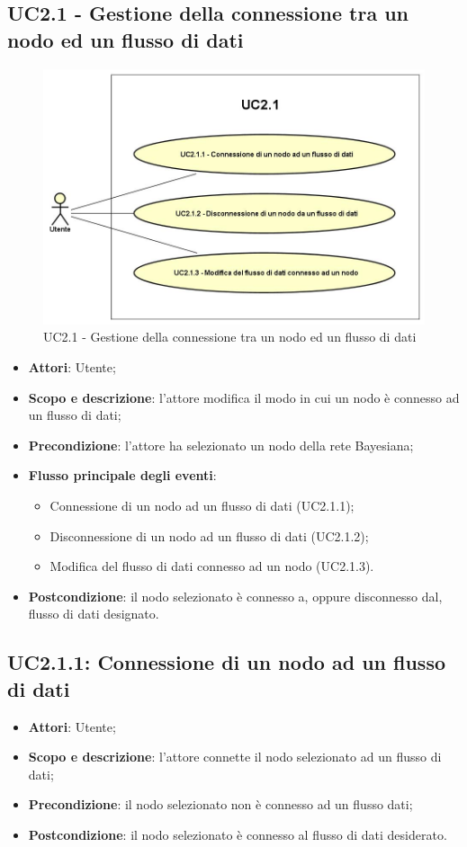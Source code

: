 \subsection{UC2.1 - Gestione della connessione tra un nodo ed un flusso di dati}
\hypertarget{UC2.1}{}
\begin{figure} [H]
	\centering
	\includegraphics[scale=0.45]{Img/UC2-1}
	\caption{UC2.1 - Gestione della connessione tra un nodo ed un flusso di dati}\label{}
\end{figure}
\begin{itemize}
	\item \textbf{Attori}: Utente;
	\item \textbf{Scopo e descrizione}: l'attore modifica il modo in cui un nodo è connesso ad un flusso di dati;
	\item \textbf{Precondizione}: l'attore ha selezionato un nodo della rete Bayesiana;
	\item \textbf{Flusso principale degli eventi}:
	\begin{itemize}
		\item Connessione di un nodo ad un flusso di dati (UC2.1.1);
		\item Disconnessione di un nodo ad un flusso di dati (UC2.1.2);
		\item Modifica del flusso di dati connesso ad un nodo (UC2.1.3).
	\end{itemize}
	\item \textbf{Postcondizione}: il nodo selezionato è connesso a, oppure disconnesso dal, flusso di dati designato.
\end{itemize}

\subsection{UC2.1.1: Connessione di un nodo ad un flusso di dati}
\hypertarget{UC2.1.1}{}
\begin{itemize}
	\item \textbf{Attori}: Utente;
	\item \textbf{Scopo e descrizione}: l'attore connette il nodo selezionato ad un flusso di dati;
	\item \textbf{Precondizione}: il nodo selezionato non è connesso ad un flusso dati;
	\item \textbf{Postcondizione}: il nodo selezionato è connesso al flusso di dati desiderato.
\end{itemize}


